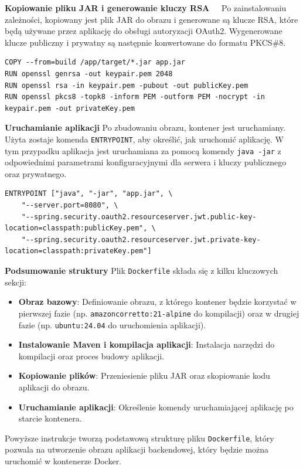 \noindent \textbf{Kopiowanie pliku JAR i generowanie kluczy RSA~~}
Po zainstalowaniu zależności, kopiowany jest plik JAR do obrazu i generowane są klucze RSA, które będą używane przez aplikację do obsługi autoryzacji OAuth2. Wygenerowane klucze publiczny i prywatny są następnie konwertowane do formatu PKCS\#8.
\begin{lstlisting}[basicstyle=\footnotesize\ttfamily]
COPY --from=build /app/target/*.jar app.jar
RUN openssl genrsa -out keypair.pem 2048
RUN openssl rsa -in keypair.pem -pubout -out publicKey.pem
RUN openssl pkcs8 -topk8 -inform PEM -outform PEM -nocrypt -in keypair.pem -out privateKey.pem
\end{lstlisting}

\noindent \textbf{Uruchamianie aplikacji}
Po zbudowaniu obrazu, kontener jest uruchamiany. Użyta zostaje komenda \texttt{ENTRYPOINT}, aby określić, jak uruchomić aplikację. W tym przypadku aplikacja jest uruchamiana za pomocą komendy \texttt{java -jar} z odpowiednimi parametrami konfiguracyjnymi dla serwera i kluczy publicznego oraz prywatnego.
\begin{lstlisting}[basicstyle=\footnotesize\ttfamily]
ENTRYPOINT ["java", "-jar", "app.jar", \
    "--server.port=8080", \
    "--spring.security.oauth2.resourceserver.jwt.public-key-location=classpath:publicKey.pem", \
    "--spring.security.oauth2.resourceserver.jwt.private-key-location=classpath:privateKey.pem"]
\end{lstlisting}

\noindent \textbf{Podsumowanie struktury}
Plik \texttt{Dockerfile} składa się z kilku kluczowych sekcji:
\begin{itemize}
    \item \textbf{Obraz bazowy}: Definiowanie obrazu, z którego kontener będzie korzystać w pierwszej fazie (np. \texttt{amazoncorretto:21-alpine} do kompilacji) oraz w drugiej fazie (np. \texttt{ubuntu:24.04} do uruchomienia aplikacji).
    \item \textbf{Instalowanie Maven i kompilacja aplikacji}: Instalacja narzędzi do kompilacji oraz proces budowy aplikacji.
    \item \textbf{Kopiowanie plików}: Przeniesienie pliku JAR oraz skopiowanie kodu aplikacji do obrazu.
    \item \textbf{Uruchamianie aplikacji}: Określenie komendy uruchamiającej aplikację po starcie kontenera.
\end{itemize}

Powyższe instrukcje tworzą podstawową strukturę pliku \texttt{Dockerfile}, który pozwala na utworzenie obrazu aplikacji backendowej, który będzie można uruchomić w kontenerze Docker.

